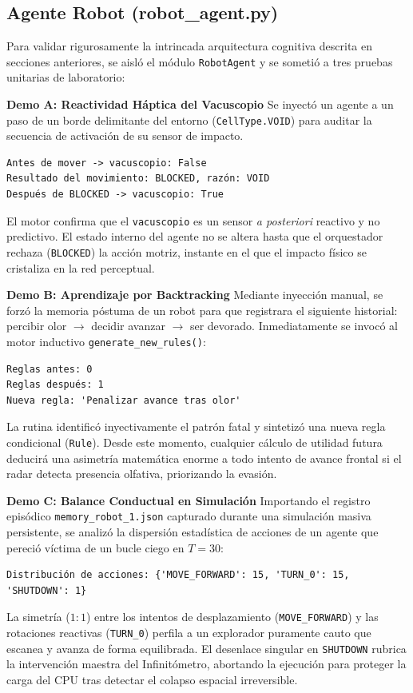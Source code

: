 \documentclass[conference]{IEEEtran}
\begin{document}
\subsection{Agente Robot (robot\_agent.py)}
Para validar rigurosamente la intrincada arquitectura cognitiva descrita en secciones anteriores, se aisló el módulo \texttt{RobotAgent} y se sometió a tres pruebas unitarias de laboratorio:

\textbf{Demo A: Reactividad Háptica del Vacuscopio}
Se inyectó un agente a un paso de un borde delimitante del entorno (\texttt{CellType.VOID}) para auditar la secuencia de activación de su sensor de impacto.
{\scriptsize
\begin{verbatim}
Antes de mover -> vacuscopio: False
Resultado del movimiento: BLOCKED, razón: VOID
Después de BLOCKED -> vacuscopio: True
\end{verbatim}
}
El motor confirma que el \texttt{vacuscopio} es un sensor \textit{a posteriori} reactivo y no predictivo. El estado interno del agente no se altera hasta que el orquestador rechaza (\texttt{BLOCKED}) la acción motriz, instante en el que el impacto físico se cristaliza en la red perceptual.

\textbf{Demo B: Aprendizaje por Backtracking}
Mediante inyección manual, se forzó la memoria póstuma de un robot para que registrara el siguiente historial: percibir olor $\rightarrow$ decidir avanzar $\rightarrow$ ser devorado. Inmediatamente se invocó al motor inductivo \texttt{generate\_new\_rules()}:
{\scriptsize
\begin{verbatim}
Reglas antes: 0
Reglas después: 1
Nueva regla: 'Penalizar avance tras olor'
\end{verbatim}
}
La rutina identificó inyectivamente el patrón fatal y sintetizó una nueva regla condicional (\texttt{Rule}). Desde este momento, cualquier cálculo de utilidad futura deducirá una asimetría matemática enorme a todo intento de avance frontal si el radar detecta presencia olfativa, priorizando la evasión.

\textbf{Demo C: Balance Conductual en Simulación}
Importando el registro episódico \texttt{memory\_robot\_1.json} capturado durante una simulación masiva persistente, se analizó la dispersión estadística de acciones de un agente que pereció víctima de un bucle ciego en $T=30$:
{\scriptsize
\begin{verbatim}
Distribución de acciones: {'MOVE_FORWARD': 15, 'TURN_0': 15, 'SHUTDOWN': 1}
\end{verbatim}
}
La simetría ($1:1$) entre los intentos de desplazamiento (\texttt{MOVE\_FORWARD}) y las rotaciones reactivas (\texttt{TURN\_0}) perfila a un explorador puramente cauto que escanea y avanza de forma equilibrada. El desenlace singular en \texttt{SHUTDOWN} rubrica la intervención maestra del Infinitómetro, abortando la ejecución para proteger la carga del CPU tras detectar el colapso espacial irreversible.
\end{document}
